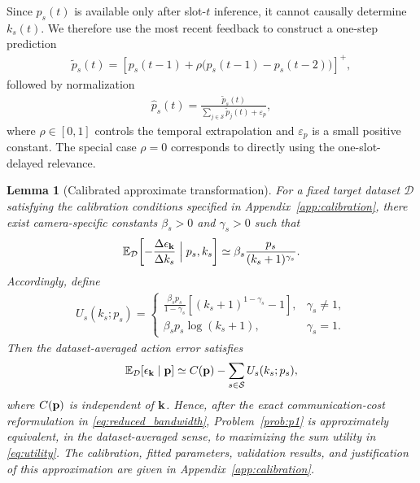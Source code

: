 \documentclass[lettersize,journal]{IEEEtran}
\theoremstyle{custom}
\newtheorem{Lem}{Lemma}
\begin{document}
Since $p_s(t)$ is available only after slot-$t$ inference, it cannot causally determine $k_s(t)$. We therefore use the most recent feedback to construct a one-step prediction
\begin{align}\label{eq:relevance_predictor}
    \widetilde p_s(t)
    =\left[p_s(t-1)+\rho\big(p_s(t-1)-p_s(t-2)\big)\right]^+,
\end{align}
followed by normalization
\begin{align}
    \widehat p_s(t)=\frac{\widetilde p_s(t)}{\sum_{j\in\mathcal S}\widetilde p_j(t)+\varepsilon_p},
\end{align}
where $\rho\in[0,1]$ controls the temporal extrapolation and $\varepsilon_p$ is a small positive constant. The special case $\rho=0$ corresponds to directly using the one-slot-delayed relevance.

\begin{Lem}[Calibrated approximate transformation]\label{lem:marginal_law}
For a fixed target dataset $\mathcal D$ satisfying the calibration conditions specified in Appendix~\ref{app:calibration}, there exist camera-specific constants $\beta_s>0$ and $\gamma_s>0$ such that
\begin{align}\label{eq:marginal_law}
    \mathbb E_{\mathcal D}\!\left[
    -\frac{\Delta\epsilon_{\bf k}}{\Delta k_s}
    \Bigm| p_s,k_s\right]
    \simeq
    \beta_s\frac{p_s}{(k_s+1)^{\gamma_s}}.
\end{align}
Accordingly, define
\begin{align}\label{eq:utility}
U_s(k_s;p_s)=
\begin{cases}
\displaystyle
\frac{\beta_s p_s}{1-\gamma_s}
\left[(k_s+1)^{1-\gamma_s}-1\right], & \gamma_s\neq1,\\[2mm]
\displaystyle
\beta_s p_s\log(k_s+1), & \gamma_s=1.
\end{cases}
\end{align}
Then the dataset-averaged action error satisfies
\begin{align}\label{eq:error_surrogate}
    \mathbb E_{\mathcal D}[\epsilon_{\bf k}\mid{\bf p}]
    \simeq C({\bf p})-\sum_{s\in\mathcal S}U_s(k_s;p_s),
\end{align}
where $C({\bf p})$ is independent of ${\bf k}$. Hence, after the exact communication-cost reformulation in \eqref{eq:reduced_bandwidth}, Problem~\ref{prob:p1} is approximately equivalent, in the dataset-averaged sense, to maximizing the sum utility in \eqref{eq:utility}. The calibration, fitted parameters, validation results, and justification of this approximation are given in Appendix~\ref{app:calibration}.
\end{Lem}
\end{document}
